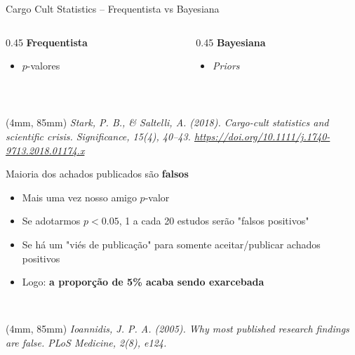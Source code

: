\documentclass[12pt, xcolor=dvipsnames]{beamer}
\newenvironment{reference}[2]{                                    %
  \begin{textblock*}{\textwidth}(#1, #2)
      \tiny\it\bgroup\color{red!70!QPblue}}{\egroup\end{textblock*}}
\begin{document}
\begin{frame}{Cargo Cult Statistics -- Frequentista vs Bayesiana}
  \begin{columns}[T]

    \begin{column}{0.45\textwidth}
      {\Large \textbf{Frequentista}}
      \begin{itemize}
        \item $p$-valores
      \end{itemize}
    \end{column}

    \begin{column}{0.45\textwidth}
      {\Large \textbf{Bayesiana}}
      \begin{itemize}
        \item \textit{Priors}
      \end{itemize}
    \end{column}
  \end{columns}

  ~\\[2ex]

  \begin{reference}{4mm}{85mm}
    Stark, P. B., \& Saltelli, A. (2018). Cargo-cult statistics and scientific crisis. Significance, 15(4), 40–43.
    \url{https://doi.org/10.1111/j.1740-9713.2018.01174.x}
  \end{reference}
\end{frame}


\begin{frame}{Maioria dos achados publicados são \textbf{falsos}}
  \begin{itemize}
    \item<2-> Mais uma vez nosso amigo $p$-valor
    \item<3-> Se adotarmos $p < 0.05$, 1 a cada 20 estudos serão "falsos positivos"
    \item<4-> Se há um "viés de publicação" para somente aceitar/publicar achados positivos
    \item<5-> Logo: \textbf{a proporção de 5\% acaba sendo exarcebada}
  \end{itemize}

  ~\\[2ex]
  \centering

  \begin{reference}{4mm}{85mm}
    Ioannidis, J. P. A. (2005). Why most published research findings are false. PLoS Medicine, 2(8), e124.
  \end{reference}
\end{frame}
\end{document}
